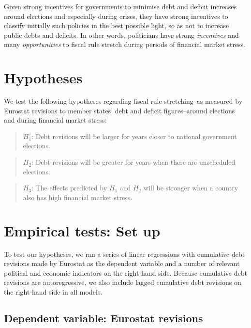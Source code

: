\documentclass[]{article}
\begin{document}
Given strong incentives for governments to minimise debt and deficit increases around elections and especially during crises, they have strong incentives to  classify initially such policies in the best possible light, so as not to increase public debts and deficits. In other words, politicians have strong \emph{incentives} and many \emph{opportunities} to fiscal rule stretch during periods of financial market stress.

\section{Hypotheses}

We test the following hypotheses regarding fiscal rule stretching--as measured by Eurostat revisions to member states' debt and deficit figures--around elections and during financial market stress:

\begin{quote}
    $H_{1}$: Debt revisions will be larger for years closer to national government elections.
\end{quote}

\begin{quote}
    $H_{2}$: Debt revisions will be greater for years when there are unscheduled elections.
\end{quote}

\begin{quote}
    $H_{3}$: The effects predicted by $H_{1}$ and $H_{2}$ will be stronger when a country also has high financial market stress.
\end{quote}


\section{Empirical tests: Set up}

To test our hypotheses, we ran a series of linear regressions with cumulative debt revisions made by Eurostat as the dependent variable and a number of relevant political and economic indicators on the right-hand side. Because cumulative debt revisions are autoregressive, we also include lagged cumulative debt revisions on the right-hand side in all models.

\subsection{Dependent variable: Eurostat revisions}
\end{document}
